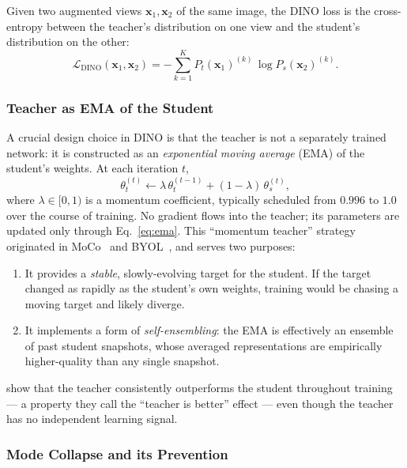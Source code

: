 \documentclass[11pt,a4paper]{article}
\newcommand{\vect}[1]{\mathbf{#1}}
\newcommand{\loss}{\mathcal{L}}
\newcommand{\thetaS}{\theta_{s}}
\newcommand{\thetaT}{\theta_{t}}
\newcommand{\PS}{P_{s}}
\newcommand{\PT}{P_{t}}
\begin{document}
Given two augmented views $\vect{x}_{1},\vect{x}_{2}$ of the same image,
the DINO loss is the cross-entropy between the teacher's distribution on
one view and the student's distribution on the other:
\begin{equation}
\loss_{\text{DINO}}(\vect{x}_{1},\vect{x}_{2}) =
- \sum_{k=1}^{K} \PT(\vect{x}_{1})^{(k)}\, \log \PS(\vect{x}_{2})^{(k)}.
\label{eq:dino-loss}
\end{equation}

\subsubsection{Teacher as EMA of the Student}

A crucial design choice in DINO is that the teacher is not a separately
trained network: it is constructed as an \emph{exponential moving average}
(EMA) of the student's weights. At each iteration $t$,
\begin{equation}
\thetaT^{(t)} \leftarrow \lambda\, \thetaT^{(t-1)} + (1-\lambda)\, \thetaS^{(t)},
\label{eq:ema}
\end{equation}
where $\lambda \in [0,1)$ is a momentum coefficient, typically scheduled
from $0.996$ to $1.0$ over the course of training. No gradient flows into
the teacher; its parameters are updated only through Eq.~\eqref{eq:ema}.
This ``momentum teacher'' strategy originated in
MoCo~\citep{he2020momentum} and BYOL~\citep{grill2020bootstrap}, and serves
two purposes:
\begin{enumerate}[leftmargin=*]
  \item It provides a \emph{stable}, slowly-evolving target for the
  student. If the target changed as rapidly as the student's own weights,
  training would be chasing a moving target and likely diverge.
  \item It implements a form of \emph{self-ensembling}: the EMA is
  effectively an ensemble of past student snapshots, whose averaged
  representations are empirically higher-quality than any single snapshot.
\end{enumerate}
\citet{caron2021emerging} show that the teacher consistently outperforms
the student throughout training --- a property they call the ``teacher is
better'' effect --- even though the teacher has no independent learning
signal.

\subsubsection{Mode Collapse and its Prevention}
\label{sec:collapse}
\end{document}
